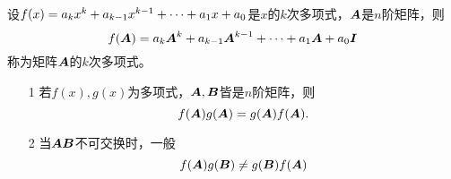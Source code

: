 % 
\begin{dingyi}[矩阵多项式]
  设$f(x)=a_kx^k+a_{k-1}x^{k-1}+\cd+a_1x+a_0$是$x$的$k$次多项式，$\MA$是$n$阶矩阵，则
  $$
  f(\MA)=a_k\MA^k+a_{k-1}\MA^{k-1}+\cd+a_1\MA+a_0\MI
  $$
  称为矩阵$\MA$的$k$次多项式。
\end{dingyi}
% 
\begin{zhu}
  \begin{itemize}
  \item[1] 若$f(x), g(x)$为多项式，$\MA,\MB$皆是$n$阶矩阵，则
    $$
    f(\MA)g(\MA) = g(\MA)f(\MA).
    $$
  \item[2] 当$\MA\MB$不可交换时，一般
    $$f(\MA)g(\MB)\ne g(\MB)f(\MA)$$
  \end{itemize}
\end{zhu}
